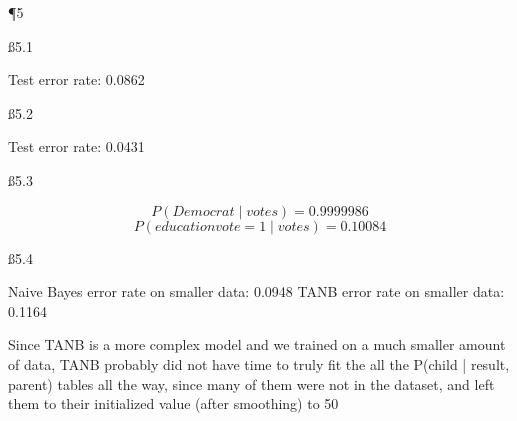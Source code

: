 \P 5

\ss {5.1}

Test error rate: 0.0862

\ss {5.2}

Test error rate: 0.0431

\ss {5.3}

\[ P (Democrat \mid votes) = 0.9999986 \]
\[ P (educationvote=1 \mid votes) = 0.10084 \]

\ss {5.4}

Naive Bayes error rate on smaller data: 0.0948
TANB error rate on smaller data: 0.1164

Since TANB is a more complex model and we trained on a much smaller amount of data, TANB probably did not have time to truly fit the all the P(child | result, parent) tables all the way, since many of them were not in the dataset, and left them to their initialized value (after smoothing) to 50%


